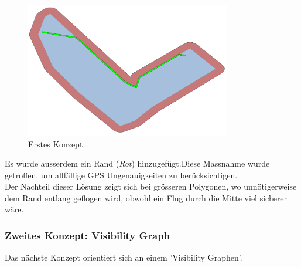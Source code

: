 \begin{figure}[H]
	\centering
	\includegraphics[width=0.8\textwidth]{images/routing/firstSolution.png}
	\caption{Erstes Konzept}
	\label{fig:first-concet-routing}
\end{figure}
Es wurde ausserdem ein Rand (\textit{Rot}) hinzugefügt.Diese Massnahme wurde getroffen, um allfällige GPS Ungenauigkeiten zu berücksichtigen.\\

Der Nachteil dieser Lösung zeigt sich bei grösseren Polygonen, wo unnötigerweise dem Rand entlang geflogen wird, obwohl ein Flug durch die Mitte viel sicherer wäre.
\newpage
\subsubsection{Zweites Konzept: Visibility Graph}
Das nächste Konzept orientiert sich an einem 'Visibility Graphen'. 
\cite[p.1]{IEEEPaper} 

